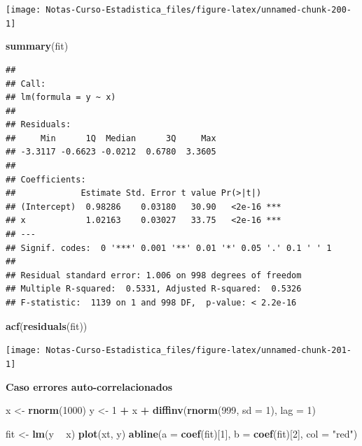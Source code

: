\documentclass[
  12pt,
]{book}
\newenvironment{Shaded}{\begin{snugshade}}{\end{snugshade}}
\newcommand{\DataTypeTok}[1]{\textcolor[rgb]{0.13,0.29,0.53}{#1}}
\newcommand{\DecValTok}[1]{\textcolor[rgb]{0.00,0.00,0.81}{#1}}
\newcommand{\KeywordTok}[1]{\textcolor[rgb]{0.13,0.29,0.53}{\textbf{#1}}}
\newcommand{\NormalTok}[1]{#1}
\newcommand{\OperatorTok}[1]{\textcolor[rgb]{0.81,0.36,0.00}{\textbf{#1}}}
\newcommand{\StringTok}[1]{\textcolor[rgb]{0.31,0.60,0.02}{#1}}
\theoremstyle{definition}
\theoremstyle{definition}
\theoremstyle{definition}
\theoremstyle{remark}
\begin{document}
\begin{center}\texttt{[image: Notas-Curso-Estadistica\_files/figure-latex/unnamed-chunk-200-1]} \end{center}

\begin{Shaded}
\begin{Highlighting}[]
\KeywordTok{summary}\NormalTok{(fit)}
\end{Highlighting}
\end{Shaded}

\begin{verbatim}
## 
## Call:
## lm(formula = y ~ x)
## 
## Residuals:
##     Min      1Q  Median      3Q     Max 
## -3.3117 -0.6623 -0.0212  0.6780  3.3605 
## 
## Coefficients:
##             Estimate Std. Error t value Pr(>|t|)    
## (Intercept)  0.98286    0.03180   30.90   <2e-16 ***
## x            1.02163    0.03027   33.75   <2e-16 ***
## ---
## Signif. codes:  0 '***' 0.001 '**' 0.01 '*' 0.05 '.' 0.1 ' ' 1
## 
## Residual standard error: 1.006 on 998 degrees of freedom
## Multiple R-squared:  0.5331, Adjusted R-squared:  0.5326 
## F-statistic:  1139 on 1 and 998 DF,  p-value: < 2.2e-16
\end{verbatim}

\begin{Shaded}
\begin{Highlighting}[]
\KeywordTok{acf}\NormalTok{(}\KeywordTok{residuals}\NormalTok{(fit))}
\end{Highlighting}
\end{Shaded}

\begin{center}\texttt{[image: Notas-Curso-Estadistica\_files/figure-latex/unnamed-chunk-201-1]} \end{center}

\textbf{Caso errores auto-correlacionados}

\begin{Shaded}
\begin{Highlighting}[]
\NormalTok{x <-}\StringTok{ }\KeywordTok{rnorm}\NormalTok{(}\DecValTok{1000}\NormalTok{)}
\NormalTok{y <-}\StringTok{ }\DecValTok{1} \OperatorTok{+}\StringTok{ }\NormalTok{x }\OperatorTok{+}\StringTok{ }\KeywordTok{diffinv}\NormalTok{(}\KeywordTok{rnorm}\NormalTok{(}\DecValTok{999}\NormalTok{, }\DataTypeTok{sd =} \DecValTok{1}\NormalTok{), }\DataTypeTok{lag =} \DecValTok{1}\NormalTok{)}
\end{Highlighting}
\end{Shaded}

\begin{Shaded}
\begin{Highlighting}[]
\NormalTok{fit <-}\StringTok{ }\KeywordTok{lm}\NormalTok{(y }\OperatorTok{~}\StringTok{ }\NormalTok{x)}
\KeywordTok{plot}\NormalTok{(xt, y)}
\KeywordTok{abline}\NormalTok{(}\DataTypeTok{a =} \KeywordTok{coef}\NormalTok{(fit)[}\DecValTok{1}\NormalTok{], }\DataTypeTok{b =} \KeywordTok{coef}\NormalTok{(fit)[}\DecValTok{2}\NormalTok{], }\DataTypeTok{col =} \StringTok{"red"}\NormalTok{)}
\end{Highlighting}
\end{Shaded}
\end{document}

